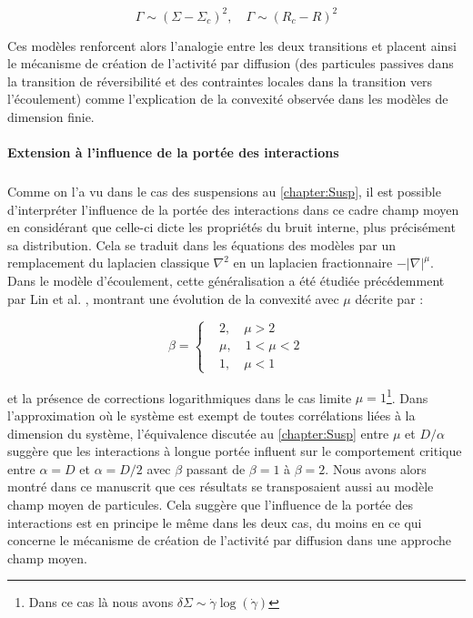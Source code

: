 \begin{equation}
	\Gamma \sim (\Sigma - \Sigma_c)^2,\quad \Gamma \sim (R_c-R)^2
\end{equation}

\noindent Ces modèles renforcent alors l'analogie entre les deux transitions et placent ainsi le mécanisme de création de l'activité par diffusion (des particules passives dans la transition de réversibilité et des contraintes locales dans la transition vers l'écoulement) comme l'explication de la convexité observée dans les modèles de dimension finie.

\paragraph{Extension à l'influence de la portée des interactions}

\subparagraph{}Comme on l'a vu dans le cas des suspensions au \autoref{chapter:Susp}, il est possible d’interpréter l'influence de la portée des interactions dans ce cadre champ moyen en considérant que celle-ci dicte les propriétés du bruit interne, plus précisément sa distribution. Cela se traduit dans les équations des modèles par un remplacement du laplacien classique $\nabla^2$ en un laplacien fractionnaire $-|\nabla|^\mu$. Dans le modèle d'écoulement, cette généralisation a été étudiée précédemment par Lin et al. \cite{lin_mean-field_2016, lin_microscopic_2018}, montrant une évolution de la convexité avec $\mu$ décrite par :

\begin{equation}
	\beta = \left\{
	\begin{aligned}
	&2, \quad \mu > 2\\
	&\mu, \quad 1<\mu<2\\
	&1, \quad \mu < 1
	\end{aligned}
	\right.
\end{equation}

\noindent et la présence de corrections logarithmiques dans le cas limite $\mu = 1$\footnote{Dans ce cas là nous avons $\delta\Sigma \sim \dot{\gamma}\log(\dot{\gamma})$}. Dans l'approximation où le système est exempt de toutes corrélations liées à la dimension du système, l'équivalence discutée au \autoref{chapter:Susp} entre $\mu$ et $D/\alpha$ suggère que les interactions à longue portée influent sur le comportement critique entre $\alpha = D$ et $\alpha = D/2$ avec $\beta$ passant de $\beta = 1$ à $\beta = 2$. Nous avons alors montré dans ce manuscrit que ces résultats se transposaient aussi au modèle champ moyen de particules. Cela suggère que l'influence de la portée des interactions est en principe le même dans les deux cas, du moins en ce qui concerne le mécanisme de création de l'activité par diffusion dans une approche champ moyen.

